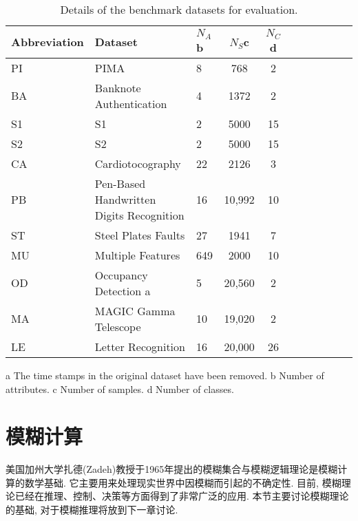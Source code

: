 {%
\begin{table*}[!ht]
\caption{Details of the benchmark datasets for evaluation.}
\begin{center}
 \begin{tabular}{lp{8cm}lcccccccc}
\toprule
Abbreviation& Dataset& $N_A$b &$N_S$c &$N_C$d \\
\hline
PI& PIMA \cite{SmithEverhart1988-5692} &8& 768& 2\\
BA& Banknote Authentication \cite{LohwegHoffmann2013-5693}& 4 &1372 &2\\
S1& S1 \cite{FrantiVirmajoki2006-5694}& 2 &5000 &15\\
S2& S2 \cite{FrantiVirmajoki2006-5694}&2 &5000 &15\\
CA& Cardiotocography \cite{AyreseCamposBernardes2000-5695}& 22& 2126& 3\\
PB& Pen-Based Handwritten Digits Recognition \cite{AlimogluAlpaydin1996-5696}& 16 &10,992& 10\\
ST& Steel Plates Faults \cite{Buscema1998-5698}& 27 &1941 &7\\
MU& Multiple Features \cite{ARJain2000-5703} &649 &2000& 10\\
OD& Occupancy Detection \cite{CandanedoFeldheim2016-5699}a& 5 &20,560& 2\\
MA& MAGIC Gamma Telescope \cite{BockChilingarian2004-5701}& 10 &19,020& 2\\
LE& Letter Recognition \cite{FreySlate1991-5702} &16 &20,000 &26\\
\bottomrule
\end{tabular}
\end{center}
\label{TT2-ELM170610:Sec5-3-1}
\end{table*}
a The time stamps in the original dataset have been removed.
b Number of attributes.
c Number of samples.
d Number of classes.
\section{模糊计算}
美国加州大学扎德(Zadeh)教授于1965年提出的模糊集合与模糊逻辑理论是模糊计算的数学基础. 它主要用来处理现实世界中因模糊而引起的不确定性. 目前, 模糊理论已经在推理、控制、决策等方面得到了非常广泛的应用. 本节主要讨论模糊理论的基础, 对于模糊推理将放到下一章讨论.

}
